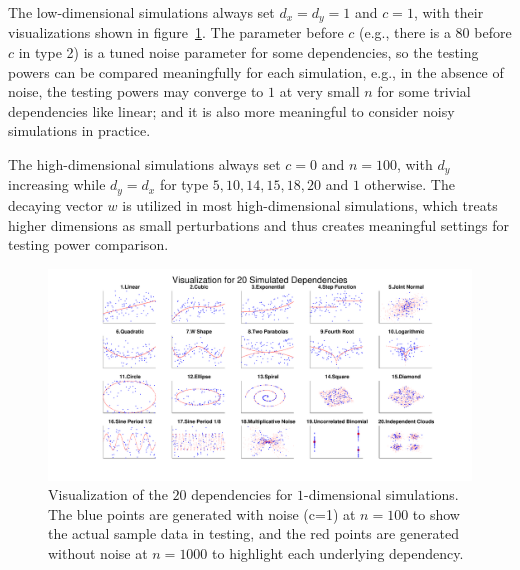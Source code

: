 \documentclass[11pt]{article}
\begin{document}
The low-dimensional simulations always set $d_{x}=d_{y}=1$ and $c=1$, with their visualizations shown in figure~\ref{fig0}. The parameter before $c$ (e.g., there is a $80$ before $c$ in type 2) is a tuned noise parameter for some dependencies, so the testing powers can be compared meaningfully for each simulation, e.g., in the absence of noise, the testing powers may converge to $1$ at very small $n$ for some trivial dependencies like linear; and it is also more meaningful to consider noisy simulations in practice. 

The high-dimensional simulations always set $c=0$ and $n=100$, with $d_{y}$ increasing while $d_{y}=d_{x}$ for type $5,10,14,15,18,20$ and $1$ otherwise. The decaying vector $w$ is utilized in most high-dimensional simulations, which treats higher dimensions as small perturbations and thus creates meaningful settings for testing power comparison. %

\begin{figure}[htbp]
\includegraphics[trim={5cm 0 3.5cm 0},clip, width=1.0\textwidth]{Figures/Fig0}
\caption{Visualization of the $20$ dependencies for $1$-dimensional simulations. The blue points are generated with noise (c=1) at $n=100$ to show the actual sample data in testing, and the red points are generated without noise at $n=1000$ to highlight each underlying dependency.
}
\label{fig0}
\end{figure}
\end{document}
